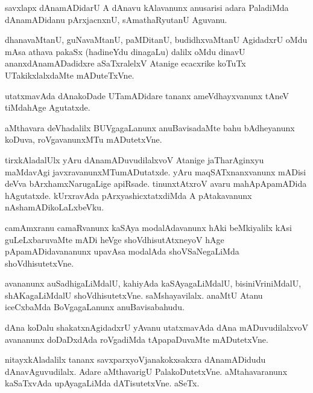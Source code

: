 \documentclass{article}
\begin{document}
\begin{mn}
savxlapx dAnamADidarU A dAnavu kAlavanunx  anusarisi adara PaladiMda dAnamADidanu 
pArxjacnxnU, sAmathaRyutanU Aguvanu.
\end{mn}

\begin{mn}
dhanavaMtanU, guNavaMtanU, paMDitanU, budidhxvaMtanU AgidadxrU oMdu mAsa athava  
pakaSx (hadineYdu dinagaLu) dalilx oMdu dinavU ananxdAnamADadidxre 
aSaTxralelxV Atanige ecacxrike koTuTx UTakikxlalxdaMte mADuteTxVne.
\end{mn}

\begin{mn}
utatxmavAda dAnakoDade UTamADidare tananx ameVdhayxvanunx tAneV tiMdahAge Agutatxde.
\end{mn}

\begin{mn}
aMthavara  deVhadalilx BUVgagaLanunx  anuBavisadaMte bahu  bAdheyanunx koDuva, roVgavanunxMTu mADutetxVne.
\end{mn}


\begin{mn}
tirxkAladalUlx yAru dAnamADuvudilalxvoV Atanige  jaTharAginxyu  maMdavAgi  
javxravanunxMTumADutatxde.  yAru  maqSATxnanxvanunx mADisi  deVva bArxhamxNarugaLige 
apiRsade. tinunxtAtxroV avaru mahApApamADida hAgutatxde.  kUrxravAda  
pArxyashicxtatxdiMda A pAtakavanunx nAshamADikoLaLxbeVku.
\end{mn}

\begin{mn}
camAmxranu camaRvanunx  kaSAya modalAdavanunx hAki beMkiyalilx kAsi guLeLxbaruvaMte mADi 
heVge shoVdhisutAtxneyoV hAge pApamADidavananunx upavAsa modalAda  shoVSaNegaLiMda shoVdhisutetxVne.
\end{mn}


\begin{mn}
avananunx  auSadhigaLiMdalU,  kahiyAda kaSAyagaLiMdalU, bisiniVriniMdalU, shAKagaLiMdalU 
shoVdhisutetxVne.  saMshayavilalx.  anaMtU Atanu iceCxbaMda BoVgagaLanunx anuBavisabahudu.
\end{mn}

\begin{mn}
dAna koDalu shakatxnAgidadxrU yAvanu utatxmavAda dAna mADuvudilalxvoV avananunx 
doDaDxdAda roVgadiMda tApapaDuvaMte mADutetxVne.
\end{mn}

\begin{mn}
nitayxkAladalilx  tananx savxparxyoVjanakokxsakxra  dAnamADidudu dAnavAguvudilalx.  
Adare aMthavarigU  PalakoDutetxVne.  aMtahavaranunx kaSaTxvAda upAyagaLiMda dATisutetxVne. aSeTx.
\end{mn}
\end{document}
